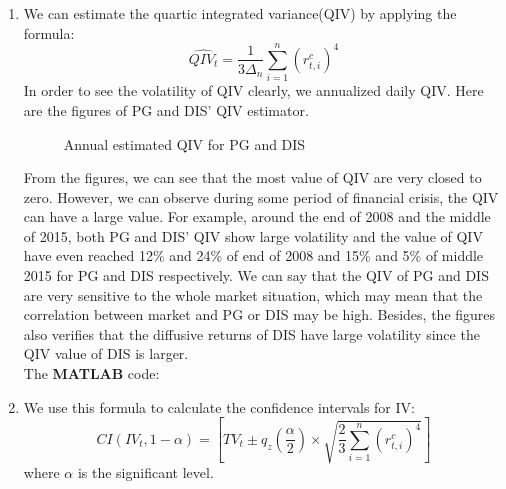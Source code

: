 \documentclass[12pt,letterpaper]{article}
\begin{document}
\begin{enumerate}[label=\textbf{(\Alph*)}]
\item We can estimate the quartic integrated variance(QIV) by applying the formula: $$\hat{QIV_t}=\frac{1}{3 \Delta_n}\sum_{i=1}^{n}(r_{t,i}^c)^4$$
In order to see the volatility of QIV clearly, we annualized daily QIV. Here are the figures of PG and DIS' QIV estimator.
 \begin{figure}[H]
            \centering
        \caption{Annual estimated QIV for PG and DIS}
\end{figure}

From the figures, we can see that the most value of QIV are very closed to zero. However, we can observe during some period of financial crisis, the QIV can have a large value. For example, around the end of 2008 and the middle of 2015, both PG and DIS' QIV show large volatility and the value of QIV have even reached 12\% and 24\% of end of 2008 and 15\% and 5\% of middle 2015 for PG and DIS respectively. We can say that the QIV of PG and DIS are very sensitive to the whole market situation, which may mean that the correlation between market and PG or DIS may be high. Besides, the figures also verifies that the diffusive returns of DIS have large volatility since the QIV value of DIS is larger. \\
   
The \textbf{MATLAB} code:
   
 
   
\item
We use this formula to calculate the confidence intervals for IV:$$CI(IV_t,1-\alpha)=[TV_t\pm q_z(\frac{\alpha}{2})\times \sqrt{\frac{2}{3}\sum_{i=1}^{n}(r_{t,i}^c)^4}]$$
where $\alpha$ is the significant level. 


\end{enumerate}
\end{document}
